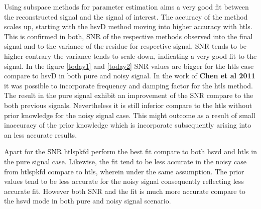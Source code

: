 Using subspace methods for parameter estimation aims a very good fit between the reconstructed signal and the signal of interest. The accuracy of the method scales up, starting with the hsvD method moving into higher accuracy with htls. This is confirmed in both, SNR of the respective methods observed into the final signal and to the variance of the residue for respective signal. SNR tends to be higher contrary the variance tends to scale down, indicating a very good fit to the signal. In the figure \ref{today1} and \ref{today2} SNR values are bigger for the htls case compare to hsvD in both pure and noisy signal. In the work of \textbf{Chen et al 2011} it was possible to incorporate frequency and damping factor for the htls method. The result in the pure signal exhibit an improvement of the SNR compare to the both previous signals. Nevertheless it is still inferior compare to the htls without prior knowledge for the noisy signal case. This might outcome as a result of small inaccuracy of the prior knowledge which is incorporate subsequently arising into an less accurate results. 

Apart for the SNR  htlspkfd perform the best fit compare to both hsvd and htls in the pure signal case. Likewise, the fit tend to be less accurate in the noisy case from htlspkfd compare to htls, wherein under the same assumption. The prior values tend to be less accurate for the noisy signal consequently reflecting less accurate fit. 
However both SNR and the fit is much more accurate compare to the hsvd mode in both pure and noisy signal scenario. 
 

  

\newpage


























